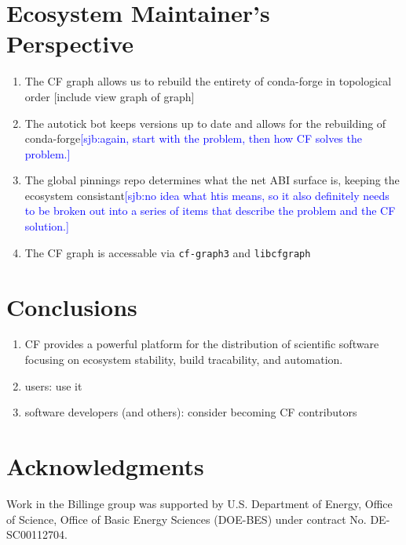 \documentclass[fleqn,10pt,lineno]{wlpeerj} %
\newcommand{\sjb}[1]{\textcolor{blue}{[sjb:#1]}}
\newcounter{saveenumi}
\newcommand{\seti}{\setcounter{saveenumi}{\value{enumi}}}
\newcommand{\conti}{\setcounter{enumi}{\value{saveenumi}}}
\begin{document}
\section*{Ecosystem Maintainer's Perspective}
\begin{enumerate}\conti
\item The CF graph allows us to rebuild the entirety of conda-forge in
topological order [include view graph of graph]
\item The autotick bot keeps versions up to date and allows for the
rebuilding of conda-forge\sjb{again, start with the problem, then how CF solves the problem.}
\item The global pinnings repo determines what the net ABI surface is,
keeping the ecosystem consistant\sjb{no idea what htis means, so it also definitely needs to be broken out into a series of items that describe the problem and the CF solution.}
\item The CF graph is accessable via \texttt{cf-graph3} and \texttt{libcfgraph}
\end{enumerate}\seti


\section*{Conclusions}
\begin{enumerate}\conti
\item CF provides a powerful platform for the distribution of scientific
software focusing on ecosystem stability, build tracability, and automation.
\item users: use it
\item software developers (and others): consider becoming CF contributors
\end{enumerate}\seti


\section*{Acknowledgments}

Work in the Billinge group was supported by U.S. Department of Energy,
Office of Science, Office of Basic Energy Sciences (DOE-BES) under contract
No. DE-SC00112704.


\end{document}
